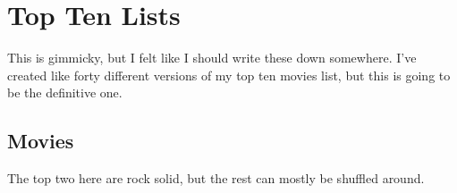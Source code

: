 \documentclass[../butidigress.tex]{subfiles}
\begin{document}
\chapter{Top Ten Lists}\label{chap:topten}
\newpage

This is gimmicky, but I felt like I should write these down somewhere.
I've created like forty different versions of my top ten movies list, but this is going to be the definitive one.

\section{Movies}\label{sec:moviestopten}
The top two here are rock solid, but the rest can mostly be shuffled around.
\end{document}
